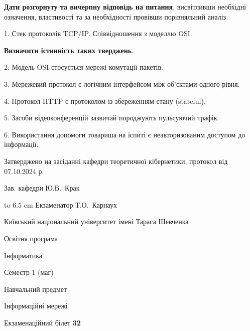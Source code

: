 \documentclass[12pt, ukrainian]{article}
\begin{document}
{
\qquad\textbf{Дати розгорнуту та вичерпну відповідь на питання}, висвітливши необхідні означення, властивості та за необхідності провівши порівняльний аналіз.

1. Стек протоколів TCP/IP. Співвідношення з моделлю OSI.



\qquad\textbf{Визначити істинність таких тверджень}.

2. Модель OSI стосується мережі комутації пакетів.


3. Мережевий протокол є логічним інтерфейсом між об'єктами одного рівня.


4. Протокол  HTTP є протоколом із збереженням стану (stateful).


5. Засоби відеоконференцій зазвичай породжують пульсуючий трафік.


6. Використання допомоги товариша на іспиті є неавторизованим доступом до інформації.

}
{\smallskip\smallskip \begin {scriptsize} Затверджено на засіданні кафедри теоретичної кібернетики, протокол   від   07.10.2024 р.\par\smallskip\smallskip\smallskip\smallskip
{\parbox {6.5 cm} {Зав. кафедри \dotfill Ю.В.~Крак}}\hspace {0.7cm} {\hbox to 6.5 cm { Екзаменатор \dotfill Т.О.~Карнаух}} \end{scriptsize}}
\vspace{0.9cm}
{{\begin {scriptsize}\par
{ \center  Київський національний університет імені Тараса Шевченка \par}
{\parbox {5 cm}{Освітня програма \hfill}{\parbox {7 cm}{Інформатика\hfill}}\parbox {6 cm}{\hfill Семестр 1 (маг)}}\par
{\parbox {5 cm} {Навчальний предмет \hfill}\parbox {7 cm}{Інформаційні мережі \hfill}\parbox {6cm}{\hfill}\par}\vspace{-15pt} \end{scriptsize}}{\center Екзаменаційний білет \No \textbf { 32 }\par}}
\end{document}
